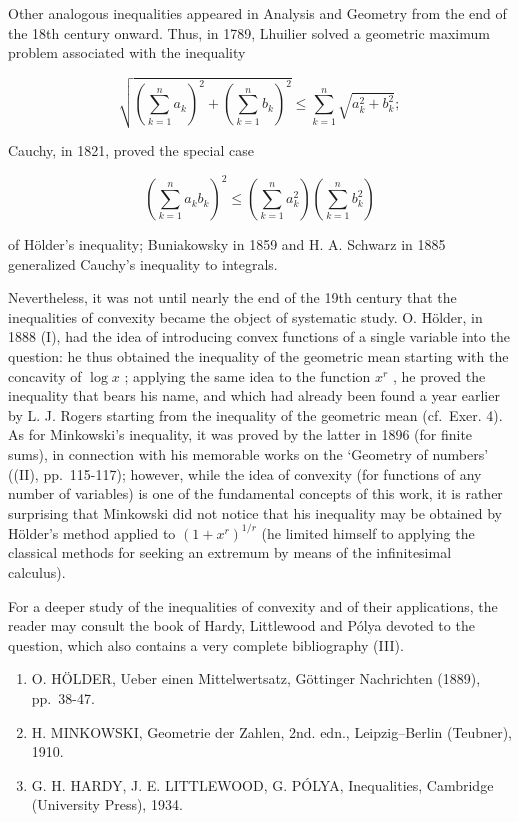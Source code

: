 Other analogous inequalities appeared in Analysis and Geometry from the end of the 18th century onward. Thus, in 1789, Lhuilier solved a geometric maximum problem associated with the inequality

\[
\sqrt {\left(\sum_ {k = 1} ^ {n} a _ {k}\right) ^ {2} + \left(\sum_ {k = 1} ^ {n} b _ {k}\right) ^ {2}} \leqslant \sum_ {k = 1} ^ {n} \sqrt {a _ {k} ^ {2} + b _ {k} ^ {2}};
\]

Cauchy, in 1821, proved the special case

\[
\left(\sum_ {k = 1} ^ {n} a _ {k} b _ {k}\right) ^ {2} \leqslant \left(\sum_ {k = 1} ^ {n} a _ {k} ^ {2}\right) \left(\sum_ {k = 1} ^ {n} b _ {k} ^ {2}\right)
\]

of Hölder's inequality; Buniakowsky in 1859 and H. A. Schwarz in 1885 generalized Cauchy's inequality to integrals.

Nevertheless, it was not until nearly the end of the 19th century that the inequalities of convexity became the object of systematic study. O. Hölder, in 1888 (I), had the idea of introducing convex functions of a single variable into the question: he thus obtained the inequality of the geometric mean starting with the concavity of \(\log x\) ; applying the same idea to the function \(x^{r}\) , he proved the inequality that bears his name, and which had already been found a year earlier by L. J. Rogers starting from the inequality of the geometric mean (cf.~Exer. 4). As for Minkowski's inequality, it was proved by the latter in 1896 (for finite sums), in connection with his memorable works on the `Geometry of numbers' ((II), pp.~115-117); however, while the idea of convexity (for functions of any number of variables) is one of the fundamental concepts of this work, it is rather surprising that Minkowski did not notice that his inequality may be obtained by Hölder's method applied to \((1 + x^{r})^{1 / r}\) (he limited himself to applying the classical methods for seeking an extremum by means of the infinitesimal calculus).

For a deeper study of the inequalities of convexity and of their applications, the reader may consult the book of Hardy, Littlewood and Pólya devoted to the question, which also contains a very complete bibliography (III).

\begin{enumerate}
\def\labelenumi{(\Roman{enumi})}
\item
  O. HÖLDER, Ueber einen Mittelwertsatz, Göttinger Nachrichten (1889), pp.~38-47.
\item
  H. MINKOWSKI, Geometrie der Zahlen, 2nd. edn., Leipzig--Berlin (Teubner), 1910.
\item
  G. H. HARDY, J. E. LITTLEWOOD, G. PÓLYA, Inequalities, Cambridge (University Press), 1934.
\end{enumerate}

